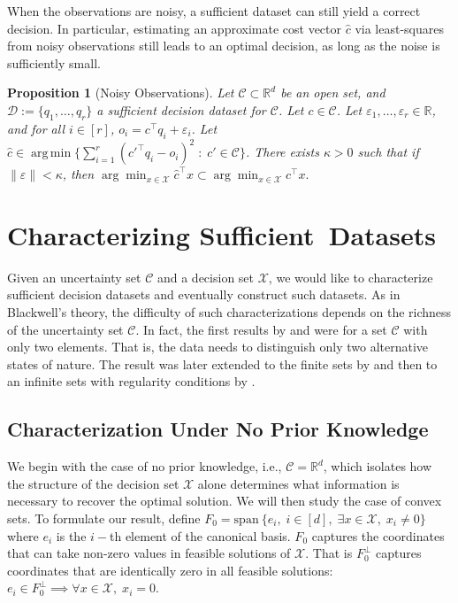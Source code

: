 \documentclass[11pt]{article}
\theoremstyle{plain}
\newtheorem{proposition}{Proposition}
\theoremstyle{definition}
\newcommand{\R}[0]{\mathbb R}
\newcommand{\Vect}{\mathrm{span}~}
\newcommand{\norm}[1]{\left\lVert#1\right\rVert}
\newcommand{\sufficient}{sufficient decision dataset}
\newcommand{\Suff}{Sufficient}
\newcommand{\cX}{\mathcal{X}}
\newcommand{\cC}{\mathcal{C}}
\newcommand{\cD}{\mathcal{D}}
\renewcommand{\Re}{\mathbb{R}}
\DeclareMathOperator*{\argmin}{arg\,min}
\begin{document}
When the observations are noisy, a sufficient dataset can still yield a correct decision.
In particular, estimating an approximate cost vector \(\hat{c}\) via least-squares from noisy observations still leads to an optimal decision, as long as the noise is sufficiently small.

\begin{proposition}[Noisy Observations] \label{prop:noisy approximation}
    Let $\cC\subset \R^d$ be an open set, and $\cD:=\{q_1,\dots,q_r\}$ a \sufficient{} for $\cC$. Let $c\in \cC$. Let $\varepsilon_1,\dots,\varepsilon_r\in \R$, and for all $i\in [r]$, $o_i=c^\top q_i + \varepsilon_i$. Let $\hat{c}\in \argmin \{\sum_{i=1}^{r}(c'^\top q_i - o_i)^2 \; : \; c' \in \cC\}$. There exists $\kappa>0$ such that if $\norm{\varepsilon}<\kappa$, then $\arg\min_{x\in \cX}\hat{c}^\top x \subset \arg\min_{x\in \cX}c^\top x.$
\end{proposition}



\section{Characterizing \Suff\ Datasets}

Given an uncertainty set $\cC$ and a decision set $\cX$, we would like to characterize \sufficient{}s and eventually construct such datasets. As in Blackwell's theory, the difficulty of such characterizations depends on the richness of the uncertainty set $\cC$. In fact, the first results by \cite{blackwellComparisonreconnaissances1949, blackwellComparisonExperiments1951} and 
\cite{shermanTheoremHardy1951} were for a set $\cC$ with only two elements. That is, the data needs to distinguish only two alternative states of nature. The result was later extended to the finite sets by \cite{blackwellEquivalentComparisonsExperiments1953} and then to an infinite sets with regularity conditions by \cite{boll_comparison_1955}.

\subsection{Characterization Under No Prior Knowledge}

We begin with the case of no prior knowledge, i.e., \(\mathcal{C} = \Re^d\), which isolates how the structure of the decision set \(\mathcal{X}\) alone determines what information is necessary to recover the optimal solution. We will then study the case of convex sets. To formulate our result, define $F_0=\Vect\{e_i,\;i\in [d],\; \exists x\in \cX,\; x_i\neq 0\}$ where $e_i$ is the $i-$th element of the canonical basis. $F_0$ captures the coordinates that can take non-zero values in feasible solutions of $\cX$. That is $F_0^\perp$ captures coordinates that are identically zero in all feasible solutions: $e_i \in F_0^\perp \implies \forall x \in \cX, \; x_i=0$.
\end{document}
